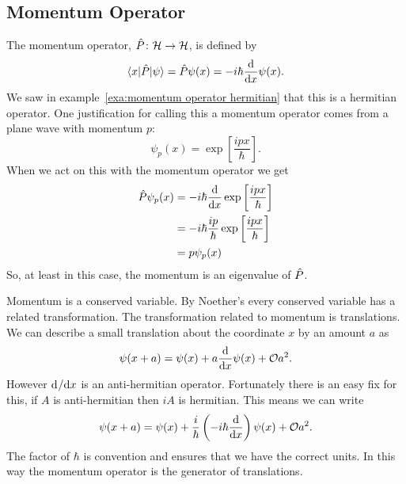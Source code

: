     \subsection{Momentum Operator}
    The momentum operator, \(\hat{P}\colon\mathcal{H}\to\mathcal{H}\), is defined by
    \[\langle {x} \vert\hat{P}\vert {\psi} \rangle = \hat{P}\psi(x) = -i\hbar\dv{x}\psi(x).\]
    We saw in example~\ref{exa:momentum operator hermitian} that this is a hermitian operator.
    One justification for calling this a momentum operator comes from a plane wave with momentum \(p\):
    \[\psi_p(x) = \exp\left[\frac{ipx}{\hbar}\right].\]
    When we act on this with the momentum operator we get
    \begin{align*}
        \hat{P}\psi_p(x) &= -i\hbar\dv{x}\exp\left[\frac{ipx}{\hbar}\right]\\
        &= -i\hbar\frac{ip}{\hbar}\exp\left[\frac{ipx}{\hbar}\right]\\
        &= p\psi_p(x)
    \end{align*}
    So, at least in this case, the momentum is an eigenvalue of \(\hat{P}\).
    
    Momentum is a conserved variable.
    By Noether's every conserved variable has a related transformation.
    The transformation related to momentum is translations.
    We can describe a small translation about the coordinate \(x\) by an amount \(a\) as
    \[\psi(x + a) = \psi(x) + a\dv{x}\psi(x) + \mathcal{O}{a^2}.\]
    However \(\mathrm{d}^{}{}/\mathrm{d}{x}^{}\) is an anti-hermitian operator.
    Fortunately there is an easy fix for this, if \(A\) is anti-hermitian then \(iA\) is hermitian.
    This means we can write
    \[\psi(x + a) = \psi(x) + \frac{i}{\hbar}\left(-i\hbar\dv{x}\right)\psi(x) + \mathcal{O}{a^2}.\]
    The factor of \(\hbar\) is convention and ensures that we have the correct units.
    In this way the momentum operator is the generator of translations.
    
